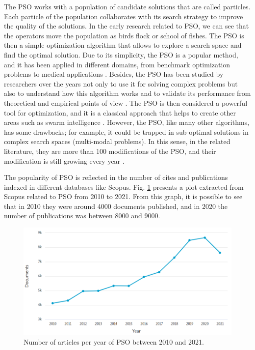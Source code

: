The PSO works with a population of candidate solutions that are called particles. Each particle of the population collaborates with its search strategy to improve the quality of the solutions. In the early research related to PSO, we can see that the operators move the population as birds flock or school of fishes. The PSO is then a simple optimization algorithm that allows to explore a search space and find the optimal solution. Due to its simplicity, the PSO is a popular method, and it has been applied in different domains, from benchmark optimization problems to medical applications \cite{shi2001particle}. Besides, the PSO has been studied by researchers over the years not only to use it for solving complex problems but also to understand how this algorithm works and to validate its performance from theoretical and empirical points of view \cite{shi1999empirical}. The PSO is then considered a powerful tool for optimization, and it is a classical approach that helps to create other areas such as swarm intelligence \cite{eberhart2001swarm}. However, the PSO, like many other algorithms, has some drawbacks; for example, it could be trapped in sub-optimal solutions in complex search spaces (multi-modal problems). In this sense, in the related literature, they are more than 100 modifications of the PSO, and their modification is still growing every year \cite{imran2013overview}.

The popularity of PSO is reflected in the number of cites and publications indexed in different databases like Scopus. Fig. \ref{fig:PSOyear} presents a plot extracted from Scopus related to PSO from 2010 to 2021. From this graph, it is possible to see that in 2010 they were around 4000 documents published, and in 2020 the number of publications was between 8000 and 9000.

\begin{figure}[h!]
  \centering
  \includegraphics[scale=0.5]{Part 2 - Search-Based Optimization/Particle Swarm Optimization/Images/PSO Year.PNG}
  \caption{Number of articles per year of PSO between 2010 and 2021. \label{fig:PSOyear}}
\end{figure}


